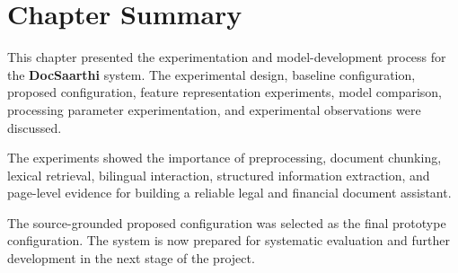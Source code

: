 \section*{Chapter Summary}

This chapter presented the experimentation and model-development
process for the \textbf{DocSaarthi} system. The experimental design,
baseline configuration, proposed configuration, feature
representation experiments, model comparison, processing parameter
experimentation, and experimental observations were discussed.

The experiments showed the importance of preprocessing, document
chunking, lexical retrieval, bilingual interaction, structured
information extraction, and page-level evidence for building a
reliable legal and financial document assistant.

The source-grounded proposed configuration was selected as the final
prototype configuration. The system is now prepared for systematic
evaluation and further development in the next stage of the project.

